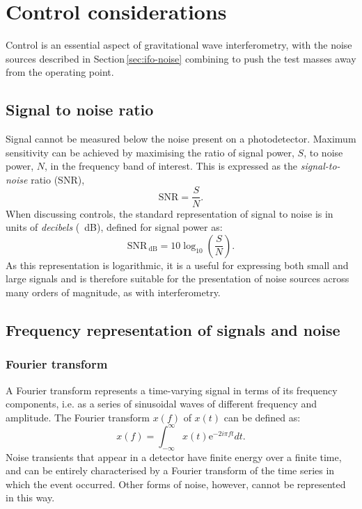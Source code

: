 \chapter{\label{a:control}Control considerations}
Control is an essential aspect of gravitational wave interferometry, with the noise sources described in Section\,\ref{sec:ifo-noise} combining to push the test masses away from the operating point.

\section{\label{sec:snr}Signal to noise ratio}
Signal cannot be measured below the noise present on a photodetector. Maximum sensitivity can be achieved by maximising the ratio of signal power, $S$, to noise power, $N$, in the frequency band of interest. This is expressed as the \emph{signal-to-noise} ratio (SNR),
\begin{equation}
  \text{SNR} = \frac{S}{N}.
\end{equation}
When discussing controls, the standard representation of signal to noise is in units of \emph{decibels} (\SI{}{\deci\bel}), defined for signal power as:
\begin{equation}
  \text{SNR}_{\SI{}{\deci\bel}} = 10 \log_{10} \left( \frac{S}{N} \right).
\end{equation}
As this representation is logarithmic, it is a useful for expressing both small and large signals and is therefore suitable for the presentation of noise sources across many orders of magnitude, as with interferometry.


\section{\label{sec:freq-resp-signals}Frequency representation of signals and noise}
\subsection{\label{sec:fourier-transform}Fourier transform}
A Fourier transform represents a time-varying signal in terms of its frequency components, i.e. as a series of sinusoidal waves of different frequency and amplitude. The Fourier transform $x \left( f \right)$ of $x \left( t \right)$ can be defined as:
\begin{equation}
  \label{eq:fourier-transform}
  x \left( f \right) = \int^{\infty}_{-\infty} x \left( t \right) \text{e}^{-2i \pi f t} dt.
\end{equation}
Noise transients that appear in a detector have finite energy over a finite time, and can be entirely characterised by a Fourier transform of the time series in which the event occurred. Other forms of noise, however, cannot be represented in this way.

